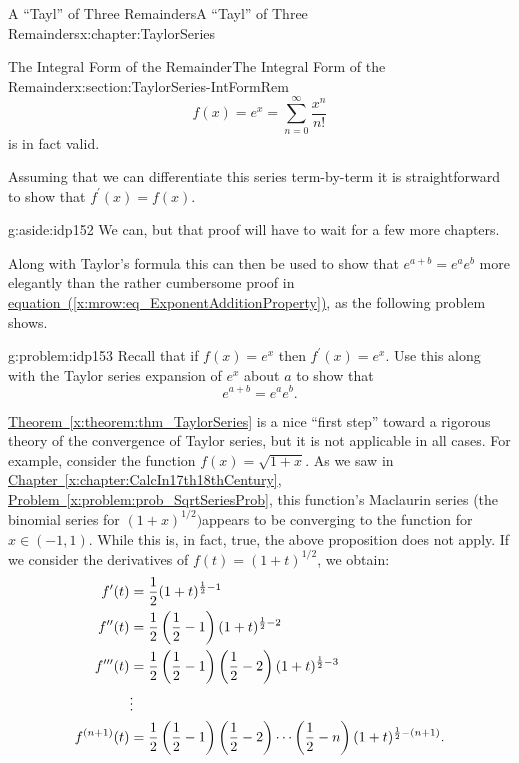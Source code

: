 \begin{chapterptx}{A ``Tayl'' of Three Remainders}{}{A ``Tayl'' of Three Remainders}{}{}{x:chapter:TaylorSeries}
\begin{sectionptx}{The Integral Form of the Remainder}{}{The Integral Form of the Remainder}{}{}{x:section:TaylorSeries-IntFormRem}
\begin{equation*}
			f(x) = e^x = \sum_{n=0}^\infty\frac{x^n}{n!}
		\end{equation*}
		is in fact valid.%
		\par
		Assuming that we can differentiate this series term-by-term it is straightforward to show that \(f^\prime(x) = f(x)\).%
		\begin{aside}{}{g:aside:idp152}%
			We can, but that proof will have to wait for a few more chapters.%
		\end{aside}
		Along with Taylor's formula this can then be used to show that \(e^{a+b}=e^ae^b\) more elegantly than the rather cumbersome proof in \hyperref[x:mrow:eq_ExponentAdditionProperty]{equation~({\xreffont\ref{x:mrow:eq_ExponentAdditionProperty}})}, as the following problem shows.%
		\begin{problem}{}{g:problem:idp153}%
			 Recall that if \(f(x)=e^x\) then \(f^\prime(x) = e^x\). Use this along with the Taylor series expansion of \(e^x\) about \(a\) to show that%
			\begin{equation*}
				e^{a+b}=e^ae^b.
			\end{equation*}
		\end{problem}
		\hyperref[x:theorem:thm_TaylorSeries]{Theorem~{\xreffont\ref{x:theorem:thm_TaylorSeries}}} is a nice ``first step'' toward a rigorous theory of the convergence of Taylor series, but it is not applicable in all cases. For example, consider the function \(f(x)=\sqrt{1+x}\). As we saw in \hyperref[x:chapter:CalcIn17th18thCentury]{Chapter~{\xreffont\ref{x:chapter:CalcIn17th18thCentury}}}, \hyperref[x:problem:prob_SqrtSeriesProb]{Problem~{\xreffont\ref{x:problem:prob_SqrtSeriesProb}}}, this function's Maclaurin series (the binomial series for \(\left(1+x\right)^{1/2})\)appears to be converging to the function for \(x\in(-1,1)\). While this is, in fact, true, the above proposition does not apply. If we consider the derivatives of \(f(t)=(1+t)^{1/2}\), we obtain:%
		\begin{align*}
			f^\prime(t)\amp =\frac{1}{2}(1+t)^{\frac{1}{2}-1}\\
			f^{\prime\prime}(t)\amp =\frac{1}{2}\left(\frac{1}{2}-1\right)(1+t)^{\frac{1}{2}-2}\\
			f^{\prime\prime\prime}(t)\amp =\frac{1}{2}\left(\frac{1}{2}-1\right)\left(\frac{1}{2}-2 \right)(1+t)^{\frac{1}{2}-3}\\
			\amp \vdots\\
			f^{(n+1)}(t)\amp =\frac{1}{2}\left(\frac{1}{2}-1\right)\left(\frac{1}{2}-2\right) \cdots\left(\frac{1}{2}-n\right)(1+t)^{\frac{1}{2}-(n+1)}\text{.}

\end{align*}
\end{sectionptx}
\end{chapterptx}
